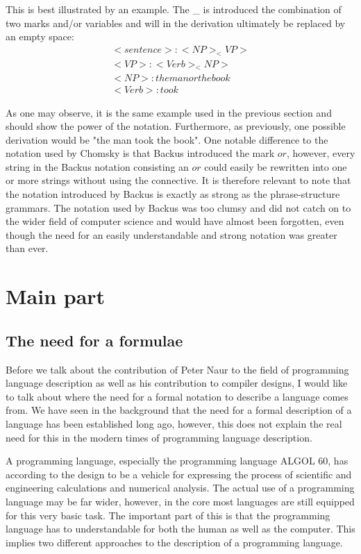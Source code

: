 \documentclass{article}
\begin{document}
This is best illustrated by an example. The _ is introduced the combination of two marks and/or variables and will in the derivation ultimately be replaced by an empty space:
\\
\begin{align*}
	<sentence>:<NP >_<VP > \\
	<VP >:<Verb>_<NP > \\
	< N P >:the manorthe book \\
	< V erb >:took
\end{align*}

As one may observe, it is the same example used in the previous section and should show the power of the notation. Furthermore, as previously, one possible derivation would be "the man took the book". One notable difference to the notation used by Chomsky is that Backus introduced the mark $or$, however, every string in the Backus notation consisting an $or$ could easily be rewritten into one or more strings without using the connective. It is therefore relevant to note that the notation introduced by Backus is exactly as strong as the phrase-structure grammars. The notation used by Backus was too clumsy and did not catch on to the wider field of computer science and would have almost been forgotten, even though the need for an easily understandable and strong notation was greater than ever.

\section{Main part}

\subsection{The need for a formulae}
Before we talk about the contribution of Peter Naur to the field of programming language description as well as his contribution to compiler designs, I would like to talk about where the need for a formal notation to describe a language comes from. We have seen in the background that the need for a formal description of a language has been established long ago, however, this does not explain the real need for this in the modern times of programming language description. 

A programming language, especially the programming language ALGOL 60, has according to \cite{naur1963documentation} the design to be a vehicle for expressing the process of scientific and engineering calculations and numerical analysis. The actual use of a programming language may be far wider, however, in the core most languages are still equipped for this very basic task. The important part of this is that the programming language has to understandable for both the human as well as the computer. This implies two different approaches to the description of a programming language.
\end{document}
